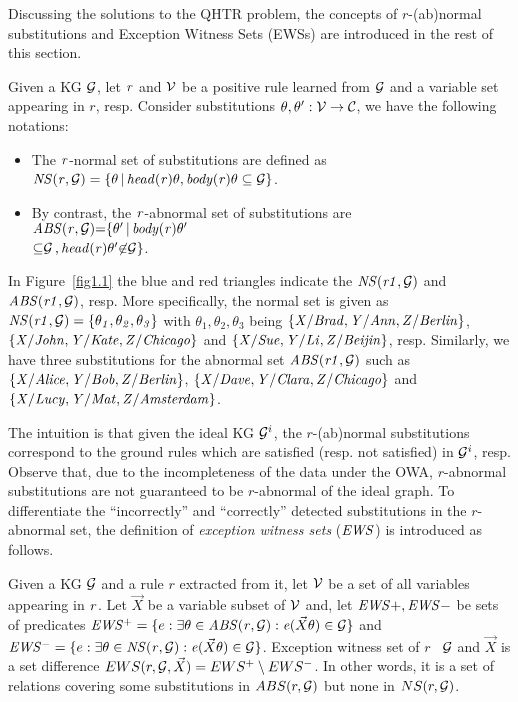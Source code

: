 Discussing the solutions to the QHTR problem, the concepts of $r$-(ab)normal substitutions and Exception Witness Sets (EWSs) are introduced in the rest of this section.

\begin{definition}\label{sec:rulelearn}
Given a KG $\mathcal{G}$, let $\mathit{r}$ and $\mathcal{V}$ be a positive rule learned from $\mathcal{G}$ and a variable set appearing in $r$, resp. Consider substitutions $\theta,\theta':\mathcal{V} \rightarrow \mathcal{C}$, we have the following notations:

\begin{itemize}
\item The $\mathit{r}$-normal set of substitutions are defined as $\mathit{NS(r, \mathcal{G})=\{\theta\, |\, head(r)\theta,body(r)\theta \subseteq \mathcal{G}\}}$.
\item By contrast, the $\mathit{r}$-abnormal set of substitutions are $\mathit{ABS(r, \mathcal{G}){=}\{\theta'\, |\, body(r)\theta'}$\\ $\mathit{{\subseteq} \mathcal{G}\,{,}\,head(r)\theta' {\not \in} \mathcal{G}\}}$.
\end{itemize}
\end{definition}

\begin{example}\label{ex:abns}
In Figure~\ref{fig1.1} the blue and red triangles indicate the $\mathit{NS(r1,\mathcal{G})}$ and $\mathit{ABS(r1,\mathcal{G})}$, resp. More specifically, the normal set is given as $\mathit{NS(r1,\mathcal{G})}=\{\mathit{\theta_1,\theta_2,\theta_3}\}$ with $\theta_1,\theta_2,\theta_3$ being $\{\mathit{X/Brad,Y/Ann,Z/Berlin}\}$, $\{\mathit{X/John,Y/Kate,Z/Chicago}\}$ and $\{\mathit{X/Sue,Y/Li,Z/Beijin}\}$, resp. Similarly, we have three substitutions for the abnormal set $\mathit{ABS(r1,\mathcal{G})}$ such as $\{\mathit{X/Alice,Y/Bob,Z/Berlin}\}$, $\{\mathit{X/Dave,Y/Clara,Z/Chicago}\}$ and $\{\mathit{X/Lucy,Y/Mat,Z/Amsterdam}\}$.
\end{example}

The intuition is that given the ideal KG $\mathcal{G}^i$, the $r$-(ab)normal substitutions correspond to the ground rules which are satisfied (resp. not satisfied) in $\mathcal{G}^i$, resp. Observe that, due to the incompleteness of the data under the OWA, $r$-abnormal substitutions are not guaranteed to be $r$-abnormal of the ideal graph. To differentiate the ``incorrectly'' and ``correctly'' detected substitutions in the $r$-abnormal set, the definition of \emph{exception witness sets} ($\mathit{EWS}$) is introduced as follows.

\begin{definition} \label{def:ews}
Given a KG $\mathcal{G}$ and a rule $r$ extracted from it, let $\mathcal{V}$ be a set of all variables appearing in $\mathit{r}$. Let $\vec{X}$ be a variable subset of $\mathcal{V}$ and, let $\mathit{EWS+, EWS-}$ be sets of predicates $\mathit{EWS^+}=\{e: \exists \theta \in \mathit{ABS(r,\mathcal{G})}: \mathit{e}(\vec{X}\theta)\in \mathcal{G}\}$ and $\mathit{EWS^-}=\{e: \exists \theta \in \mathit{NS(r,\mathcal{G})}: \mathit{e}(\vec{X}\theta)\in \mathcal{G}\}$. Exception witness set of $r$ \wrt\ $\mathcal{G}$ and $\vec{X}$ is a set difference $EWS(r,\mathcal{G},\vec{X})=EWS^+ \setminus EWS^-$. In other words, it is a set of relations covering some substitutions in $ABS(r, \mathcal{G})$ but none in $NS(r, \mathcal{G})$.
\end{definition}

